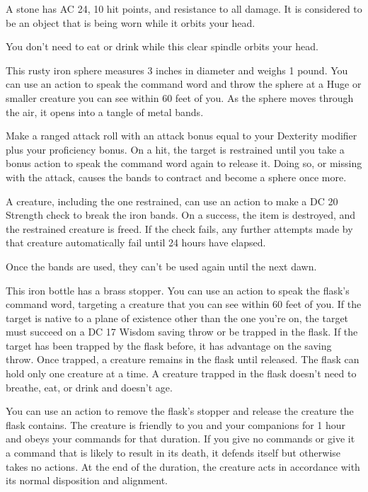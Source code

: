 \documentclass[10pt,a4paper,twoside,bg=print,twocolumn,openany,nodeprecatedcode]{dndbook}
\begin{document}
A stone has AC 24, 10 hit points, and resistance to all damage. It is considered to be an object that is being worn while it orbits your head.

You don't need to eat or drink while this clear spindle orbits your head.

This rusty iron sphere measures 3 inches in diameter and weighs 1 pound. You can use an action to speak the command word and throw the sphere at a Huge or smaller creature you can see within 60 feet of you. As the sphere moves through the air, it opens into a tangle of metal bands.

Make a ranged attack roll with an attack bonus equal to your Dexterity modifier plus your proficiency bonus. On a hit, the target is restrained until you take a bonus action to speak the command word again to release it. Doing so, or missing with the attack, causes the bands to contract and become a sphere once more.

A creature, including the one restrained, can use an action to make a DC 20 Strength check to break the iron bands. On a success, the item is destroyed, and the restrained creature is freed. If the check fails, any further attempts made by that creature automatically fail until 24 hours have elapsed.

Once the bands are used, they can't be used again until the next dawn.

This iron bottle has a brass stopper. You can use an action to speak the flask's command word, targeting a creature that you can see within 60 feet of you. If the target is native to a plane of existence other than the one you're on, the target must succeed on a DC 17 Wisdom saving throw or be trapped in the flask. If the target has been trapped by the flask before, it has advantage on the saving throw. Once trapped, a creature remains in the flask until released. The flask can hold only one creature at a time. A creature trapped in the flask doesn't need to breathe, eat, or drink and doesn't age.

You can use an action to remove the flask's stopper and release the creature the flask contains. The creature is friendly to you and your companions for 1 hour and obeys your commands for that duration. If you give no commands or give it a command that is likely to result in its death, it defends itself but otherwise takes no actions. At the end of the duration, the creature acts in accordance with its normal disposition and alignment.
\end{document}
